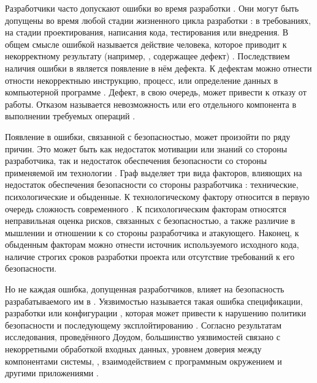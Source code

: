 %
Разработчики часто допускают ошибки во время разработки . 
%
Они могут быть допущены во время любой стадии жизненного цикла разработки : 
в требованиях, на стадии проектирования, написания кода, тестирования или внедрения. 
%
В общем смысле ошибкой называется действие человека, которое приводит к некорректному результату 
(например, , содержащее дефект) . 
%
Последствием наличия ошибки в  является появление в нём дефекта. 
%
К дефектам можно отнести отности некорректныю инструкцию, процесс, или определение данных 
в компьютерной программе . 
%
Дефект, в свою очередь, может привести к отказу  от работы. 
%
Отказом называется невозможность  или его отдельного компонента 
в выполнении требуемых операций .

%
Появление в  ошибки, связанной с безопасностью, может произойти по ряду 
причин. 
%
Это может быть как недостаток мотивации или знаний со стороны разработчика, так и 
недостаток обеспечения безопасности со стороны применяемой им технологии . 
%
Граф выделяет три вида факторов, влияющих на недостаток обеспечения безопасности со стороны 
разработчика : технические, психологические и обыденные. 
%
К технологическому фактору относится в первую очередь сложность современного 
. 
%
К психологическим факторам относятся неправильная оценка рисков, связанных с безопасностью, а также 
различие в мышлении и отношении к  со стороны разработчика и атакующего. 
%
Наконец, к обыденным факторам можно отнести источник используемого исходного кода, наличие строгих 
сроков разработки проекта или отсутствие требований к его безопасности.

%
Но не каждая ошибка, допущенная разработчиков, влияет на безопасность разрабатываемого им в 
. 
%
Уязвимостью называется такая ошибка спецификации, разработки или конфигурации 
, которая может привести к нарушению политики безопасности и последующему 
эксплойтированию    
 .
%
Согласно результатам исследования, проведённого Доудом, большинство уязвимостей связано с 
некорретными обработкой входных данных, уровнем доверия между компонентами системы, 
, взаимодействием с программным окружением и другими приложениями 
. 

